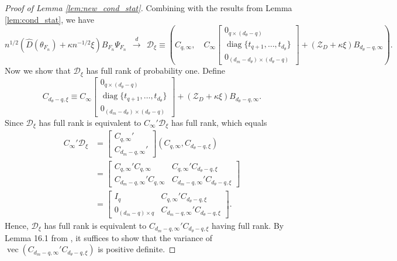 \documentclass[11pt]{article}
\theoremstyle{definition}
\DeclareMathOperator*{\diag}{diag}
\newcommand{\0}{\ensuremath{\mathbf{0}}}
\begin{document}
\begin{bibunit}
\begin{proof}[Proof of Lemma \ref{lem:new_cond_stat}]
	Combining with the results from Lemma \ref{lem:cond_stat}, we have
	\[
		n^{1/2} (\hat{D}(\theta_{F_n}) + \kappa n^{-1/2}\xi) B_{F_n} \Psi_{F_n}
		~~\xrightarrow{d}~~
        \mathcal{D}_\xi \equiv
		\left(C_{q,\infty}, \quad C_\infty 
		\begin{bmatrix}
			0_{q\times(d_\theta - q)} \\
			\diag\{t_{q+1}, \ldots, t_{d_\theta}\} \\
			0_{(d_m-d_\theta)\times (d_\theta - q) }
		\end{bmatrix} 
		+
		 (\mathcal{Z}_D + \kappa\xi)
		B_{d_\theta - q, \infty}\right).
	\]
	Now we show that $\mathcal{D}_\xi$ has full rank of probability one. Define 
	\[
		C_{d_\theta - q, \xi} \equiv C_\infty 
		\begin{bmatrix}
			0_{q\times(d_\theta - q)} \\
			\diag\{t_{q+1}, \ldots, t_{d_\theta}\} \\
			0_{(d_m-d_\theta)\times (d_\theta - q) }
		\end{bmatrix} 
		+
		(\mathcal{Z}_D + \kappa\xi)
		B_{d_\theta - q, \infty}.
	\]
	Since $\mathcal{D}_\xi$ has full rank is equivalent to $C_{\infty}'\mathcal{D}_\xi$ has full rank, which equals
	\begin{align*}
		C_{\infty}'\mathcal{D}_\xi
		&=
		\begin{bmatrix}
			C_{q,\infty}' \\
			C_{d_m - q, \infty}'
		\end{bmatrix}
		(C_{q,\infty}, C_{d_\theta - q, \xi}) \\
		&=
		\begin{bmatrix}
			C_{q,\infty}' C_{q, \infty} & C_{q,\infty}'C_{d_\theta - q, \xi} \\
			C_{d_m-q,\infty}' C_{q,\infty} & C_{d_m-q,\infty}'C_{d_\theta - q, \xi}
		\end{bmatrix} \\
		&=
		\begin{bmatrix}
			I_q & C_{q,\infty}'C_{d_\theta - q, \xi} \\
			0_{(d_m-q)\times q} & C_{d_m-q,\infty}'C_{d_\theta - q, \xi}
		\end{bmatrix}.
	\end{align*}
	Hence, $\mathcal{D}_\xi$ has full rank is equivalent to $C_{d_m-q,\infty}'C_{d_\theta - q, \xi}$ having full rank. By Lemma 16.1 from \cite{andrews/guggenberger:2017}, it suffices to show that the variance of $\operatorname{vec}(C_{d_m-q,\infty}'C_{d_\theta - q, \xi})$ is positive definite. 
	

\end{proof}
\end{bibunit}
\end{document}
